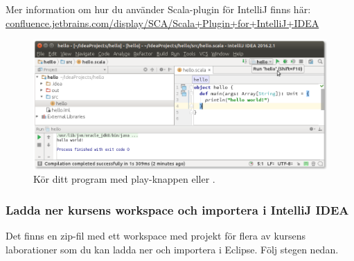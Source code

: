 \noindent Mer information om hur du använder Scala-plugin för IntelliJ finns här:\\
\href{https://confluence.jetbrains.com/display/SCA/Scala+Plugin+for+IntelliJ+IDEA}{confluence.jetbrains.com/display/SCA/Scala+Plugin+for+IntelliJ+IDEA}

\begin{figure}
\centering
\includegraphics[width=1.0\textwidth]{../img/intellij/idea-hello.png}
\caption{Kör ditt program med play-knappen eller .}
\label{fig:idea:hello-world}
\end{figure}


\subsubsection{Ladda ner kursens workspace och importera i IntelliJ IDEA}

Det finns en zip-fil med ett workspace med projekt för flera av kursens laborationer som du kan ladda ner och importera i Eclipse. Följ stegen nedan.


